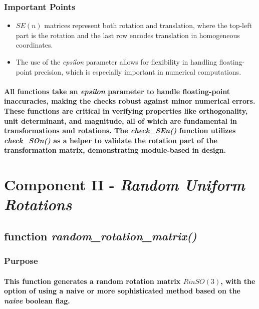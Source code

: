 \documentclass[12pt, letterpaper]{article}
\begin{document}
\subsubsection{Important Points}
\begin{itemize}
    \item{$SE(n)$ matrices represent both rotation and translation, where the top-left part is the rotation and the last row encodes translation in homogeneous coordinates.}
    \item{The use of the \textit{epsilon} parameter allows for flexibility in handling floating-point precision, which is especially important in numerical computations.}
\end{itemize}
\paragraph{All functions take an \textit{epsilon} parameter to handle floating-point inaccuracies, making the checks robust against minor numerical errors. These functions are critical in verifying properties like orthogonality, unit determinant, and magnitude, all of which are fundamental in transformations and rotations. The \textit{check\_SEn()} function utilizes \textit{check\_SOn()} as a helper to validate the rotation part of the transformation matrix, demonstrating module-based in design.}
\section{Component II - \textit{Random Uniform Rotations}}
\subsection{function \textit{random\_rotation\_matrix()}}
\subsubsection{Purpose}
\paragraph{This function generates a random rotation matrix $R in SO(3)$, with the option of using a naive or more sophisticated method based on the \textit{naive} boolean flag.}
\end{document}
